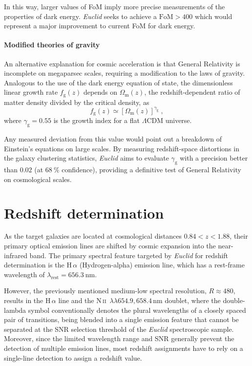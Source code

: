 \documentclass[12pt,a4paper,oneside]{report}
\begin{document}
In this way, larger values of FoM imply more precise measurements of the properties of dark energy. \textit{Euclid} seeks to achieve a $\mathrm{FoM} > 400$ which would represent a major improvement to current FoM for dark energy.

\paragraph{Modified theories of gravity}\label{parag:ModifiedGravity}
An alternative explanation for cosmic acceleration is that General Relativity is incomplete on megaparsec scales, requiring a modification to the laws of gravity. Analogous to the use of the dark energy equation of state, the dimensionless linear growth rate $f_\mathrm{g}(z)$ depends on $\Omega_\mathrm{m}(z)$, the redshift-dependent ratio of matter density divided by the critical density, as
\begin{equation}
  f_\mathrm{g}(z) \simeq [\Omega_\mathrm{m}(z)]^{\gamma_\mathrm{g}} \; ,
  \label{eq:LinearGrowthRate}
\end{equation}
where $\gamma_\mathrm{g} = 0.55$ is the growth index for a flat $\Lambda\mathrm{CDM}$ universe.

Any measured deviation from this value would point out a breakdown of Einstein’s equations on large scales. By measuring redshift-space distortions in the galaxy clustering statistics, \textit{Euclid} aims to evaluate $\gamma_\mathrm{g}$ with a precision better than $0.02$ (at $\SI{68}{\percent}$ confidence), providing a definitive test of General Relativity on cosmological scales.

\section{Redshift determination}\label{sec:RedshiftDetermination}
As the target galaxies are located at cosmological distances $0.84 < z < 1.88$, their primary optical emission lines are shifted by cosmic expansion into the near-infrared band.  The primary spectral feature targeted by \textit{Euclid} for redshift determination is the $\mathrm{H}\,\alpha$ (Hydrogen-alpha) emission line, which has a rest-frame wavelength of $\lambda_\mathrm{rest} = \SI{656.3}{\nano\meter}$.

However, the previously mentioned medium-low spectral resolution, $R \approx 480$, results in the $\mathrm{H}\,\alpha$ line and the N\,\textsc{ii}~$\lambda\lambda 654.9,658.4 \,\mathrm{nm}$ doublet, where the double-lambda symbol conventionally denotes the plural wavelengths of a closely spaced pair of transitions, being blended into a single emission feature that cannot be separated at the SNR selection threshold of the \textit{Euclid} spectroscopic sample. Moreover, since the limited wavelength range and SNR generally prevent the detection of multiple emission lines, most redshift assignments have to rely on a single-line detection to assign a redshift value.
\end{document}
